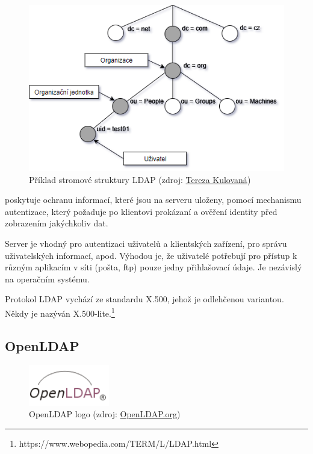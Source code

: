 \begin{figure}[H] \centering
      \includegraphics[width=380pt]{./pictures/ldap_dit.png}
      \caption[Příklad stromové struktury LDAP]{Příklad stromové struktury LDAP (zdroj:
	  \href{}{Tereza Kulovaná})}
      \label{fig:ldap-dit}
\end{figure}

 poskytuje ochranu informací, které jsou na serveru uloženy, pomocí mechanismu autentizace, který požaduje po klientovi prokázaní a ověření identity před zobrazením jakýchkoliv dat. 

Server  je vhodný pro autentizaci uživatelů a klientských zařízení, pro správu uživatelských informací, apod. Výhodou je, že uživatelé potřebují pro přístup k různým aplikacím v síti (pošta, ftp) pouze jedny přihlašovací údaje. Je nezávislý na operačním systému.

Protokol LDAP vychází ze standardu X.500, jehož je odlehčenou variantou. Někdy je nazýván X.500-lite.\footnote{https://www.webopedia.com/TERM/L/LDAP.html}

\newpage
\subsection{OpenLDAP}
\label{openldap}

\begin{figure}[H] \centering
      \includegraphics[width=100pt]{./pictures/LDAPlogo.png}
      \caption[OpenLDAP logo]{OpenLDAP logo (zdroj:
	  \href{http://www.openldap.org/images/headers/LDAPlogo.gif}{OpenLDAP.org})}
      \label{fig:ldap}
\end{figure}

